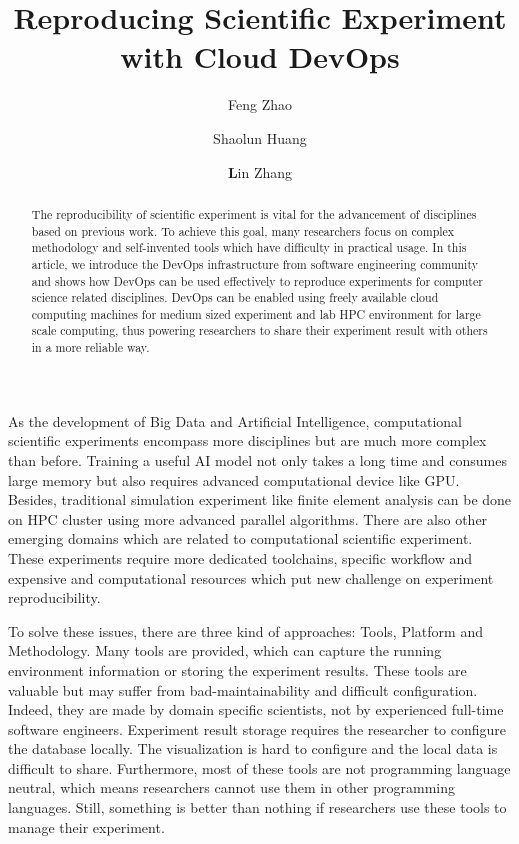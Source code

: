 \documentclass{IEEEcsmag}
\begin{document}

\title{Reproducing Scientific Experiment with Cloud DevOps}

\author{Feng Zhao}

\author{Shaolun Huang}

\author{\textbf{L}in Zhang}


\begin{abstract}
The reproducibility of scientific experiment is vital for the advancement of disciplines based on previous work. To achieve this goal, many researchers focus on complex methodology and self-invented tools which have difficulty in practical usage. In this article, we introduce the DevOps infrastructure from software engineering community and shows how DevOps can be used effectively to reproduce experiments for computer science related disciplines. DevOps can be enabled using freely available cloud computing machines for medium sized experiment and lab HPC environment for large scale computing, thus powering researchers to share their experiment result with others in a more reliable way.
\end{abstract}

\maketitle

 As the development of Big Data and Artificial Intelligence, computational scientific experiments encompass more disciplines but are much more complex than before. Training a useful AI model not only takes a long time and consumes large memory but also requires advanced computational device like GPU. Besides, traditional simulation experiment like finite element analysis can be done on HPC cluster using more advanced parallel algorithms. There are also other emerging domains which are related to computational scientific experiment. These experiments require more dedicated toolchains, specific workflow and expensive and computational resources which put new challenge on experiment reproducibility.

To solve these issues, there are three kind of approaches: Tools, Platform and Methodology. Many tools \cite{greff2017sacred} are provided, which can capture the running environment information or storing the experiment results. These tools are valuable but may suffer from bad-maintainability and difficult configuration. Indeed, they are made by domain specific scientists, not by experienced full-time software engineers. Experiment result storage requires the researcher to configure the database locally. The visualization is hard to configure and the local data is difficult to share. Furthermore, most of these tools are not programming language neutral, which means researchers cannot use them in other programming languages. Still, something is better than nothing if researchers use these tools to manage their experiment.
\end{document}
